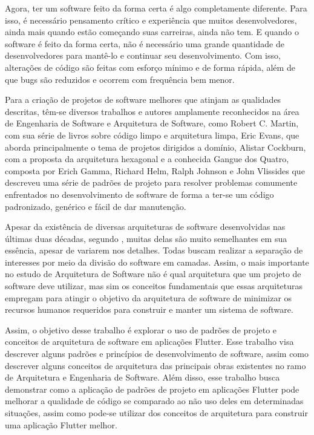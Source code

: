 \documentclass[12pt, %
openright, 
oneside, %
a4paper,    %
brazil]{facom-ufu-abntex2}
\begin{document}
Agora, ter um software feito da forma certa é algo completamente diferente. Para isso, é necessário pensamento crítico e experiência que muitos desenvolvedores, ainda mais quando estão começando suas carreiras, ainda não tem. E quando o software é feito da forma certa, não é necessário uma grande quantidade de desenvolvedores para mantê-lo e continuar seu desenvolvimento. Com isso, alterações de código são feitas com esforço mínimo e de forma rápida, além de que bugs são reduzidos e ocorrem com frequência bem menor\cite{Martin17}.

Para a criação de projetos de software melhores que atinjam as qualidades descritas, têm-se diversos trabalhos e autores amplamente reconhecidos na área de Engenharia de Software e Arquitetura de Software, como Robert C. Martin, com sua série de livros sobre código limpo e arquitetura limpa, Eric Evans, que aborda principalmente o tema de projetos dirigidos a domínio, Alistar Cockburn, com a proposta da arquitetura hexagonal e a conhecida Gangue dos Quatro, composta por Erich Gamma, Richard Helm, Ralph Johnson e John Vlissides que descreveu uma série de padrões de projeto para resolver problemas comumente enfrentados no desenvolvimento de software de forma a ter-se um código padronizado, genérico e fácil de dar manutenção.

Apesar da existência de diversas arquiteturas de software desenvolvidas nas últimas duas décadas, segundo , muitas delas são muito semelhantes em sua essência, apesar de variarem nos detalhes. Todas buscam realizar a separação de interesses por meio da divisão do software em camadas. Assim, o mais importante no estudo de Arquitetura de Software não é qual arquitetura que um projeto de software deve utilizar, mas sim os conceitos fundamentais que essas arquiteturas empregam para atingir o objetivo da arquitetura de software de minimizar os recursos humanos requeridos para construir e manter um sistema de software\cite{Martin17}.

Assim, o objetivo desse trabalho é explorar o uso de padrões de projeto e conceitos de arquitetura de software em aplicações Flutter. Esse trabalho visa descrever alguns padrões e princípios de desenvolvimento de software, assim como descrever alguns conceitos de arquitetura das principais obras existentes no ramo de Arquitetura e Engenharia de Software. Além disso, esse trabalho busca demonstrar como a aplicação de padrões de projeto em aplicações Flutter pode melhorar a qualidade de código se comparado ao não uso deles em determinadas situações, assim como pode-se utilizar dos conceitos de arquitetura para construir uma aplicação Flutter melhor.
\end{document}
